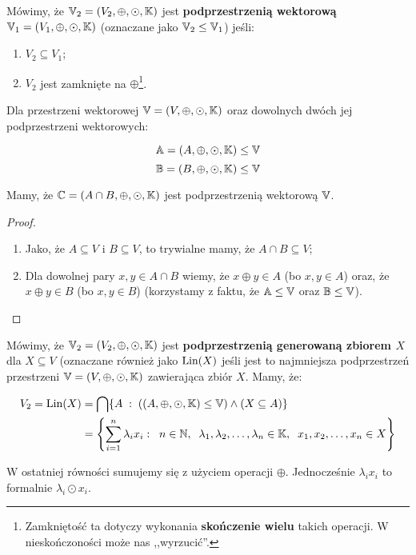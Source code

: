 \begin{definition}
Mówimy, że \(\mathbb{V}_2 = (V_2, \oplus, \odot, \mathbb{K})\) jest \textbf{podprzestrzenią wektorową} \(\mathbb{V}_1 = (V_1, \oplus, \odot, \mathbb{K})\) (oznaczane jako \(\mathbb{V}_2 \leq \mathbb{V}_1\)) jeśli:

\begin{enumerate}
    \item \( V_2 \subseteq V_1\);
    \item \(V_2\) jest zamknięte na \(\oplus\)\footnote{Zamkniętość ta dotyczy wykonania \textbf{skończenie wielu} takich operacji. W nieskończoności może nas ,,wyrzucić''.}. 
\end{enumerate}
\end{definition}


\begin{lemma}
Dla przestrzeni wektorowej \(\mathbb{V} = (V, \oplus, \odot, \mathbb{K})\) oraz dowolnych dwóch jej podprzestrzeni wektorowych:

\[
\mathbb{A} = (A, \oplus, \odot, \mathbb{K}) \leq \mathbb{V}
\]
\[
\mathbb{B} = (B, \oplus, \odot, \mathbb{K}) \leq \mathbb{V}
\]

Mamy, że \(\mathbb{C} = (A \cap B, \oplus, \odot, \mathbb{K})\) jest podprzestrzenią wektorową \(\mathbb{V}\).
\end{lemma}
\begin{proof}
\begin{enumerate}
    \item Jako, że \(A \subseteq V\) i \(B \subseteq V\), to trywialne mamy, że \( A \cap B \subseteq V\); 
    \item Dla dowolnej pary \(x, y \in A \cap B\) wiemy, że \(x \oplus y \in A\) (bo \(x, y \in A\)) oraz, że \(x \oplus y \in B\) (bo \(x, y \in B\)) (korzystamy z faktu, że \(\mathbb{A} \leq \mathbb{V}\) oraz \( \mathbb{B} \leq \mathbb{V}\)).
\end{enumerate}
\end{proof}

\begin{definition}
Mówimy, że \(\mathbb{V}_2 = (V_2, \oplus, \odot, \mathbb{K})\) jest \textbf{podprzestrzenią generowaną zbiorem \(X\)} dla \(X \subseteq V\) (oznaczane również jako \({\mathrm{Lin}}(X)\) jeśli jest to najmniejsza podprzestrzeń przestrzeni \( \mathbb{V} = (V, \oplus, \odot, \mathbb{K})\) zawierająca zbiór \(X\). Mamy, że: 

\begin{align*}
        V_2 = \lin(X) &= \bigcap \set{A \; : \; ((A, \oplus, \odot, \field) \leq \vfield) \land (X \subseteq A)} \\ 
        &= \set{\sum_{i=1}^{n} \lambda_i x_i : \; \; n \in \natural, \; \; \lambda_1, \lambda_2, \dots, \lambda_n \in \field, \; \; x_1, x_2, \dots, x_n \in X}
\end{align*}

W ostatniej równości sumujemy się z użyciem operacji \( \oplus \). Jednocześnie \(\lambda_i x_i\) to formalnie \(\lambda_i \odot x_i\). 

\end{definition}

